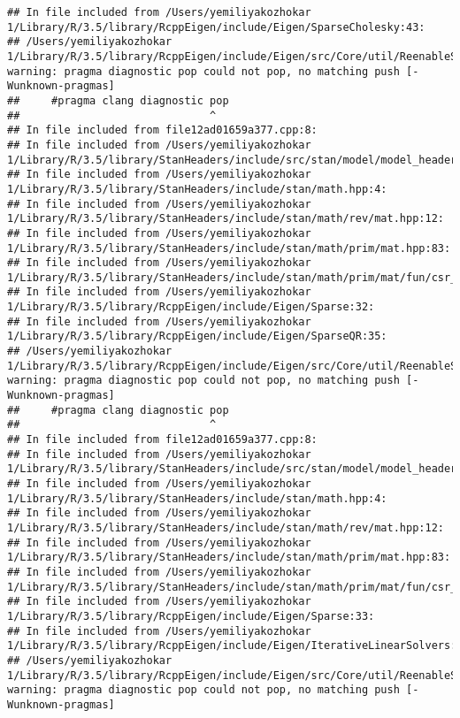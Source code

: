 \documentclass[]{article}
\begin{document}
\begin{verbatim}
## In file included from /Users/yemiliyakozhokar 1/Library/R/3.5/library/RcppEigen/include/Eigen/SparseCholesky:43:
## /Users/yemiliyakozhokar 1/Library/R/3.5/library/RcppEigen/include/Eigen/src/Core/util/ReenableStupidWarnings.h:10:30: warning: pragma diagnostic pop could not pop, no matching push [-Wunknown-pragmas]
##     #pragma clang diagnostic pop
##                              ^
## In file included from file12ad01659a377.cpp:8:
## In file included from /Users/yemiliyakozhokar 1/Library/R/3.5/library/StanHeaders/include/src/stan/model/model_header.hpp:4:
## In file included from /Users/yemiliyakozhokar 1/Library/R/3.5/library/StanHeaders/include/stan/math.hpp:4:
## In file included from /Users/yemiliyakozhokar 1/Library/R/3.5/library/StanHeaders/include/stan/math/rev/mat.hpp:12:
## In file included from /Users/yemiliyakozhokar 1/Library/R/3.5/library/StanHeaders/include/stan/math/prim/mat.hpp:83:
## In file included from /Users/yemiliyakozhokar 1/Library/R/3.5/library/StanHeaders/include/stan/math/prim/mat/fun/csr_extract_u.hpp:6:
## In file included from /Users/yemiliyakozhokar 1/Library/R/3.5/library/RcppEigen/include/Eigen/Sparse:32:
## In file included from /Users/yemiliyakozhokar 1/Library/R/3.5/library/RcppEigen/include/Eigen/SparseQR:35:
## /Users/yemiliyakozhokar 1/Library/R/3.5/library/RcppEigen/include/Eigen/src/Core/util/ReenableStupidWarnings.h:10:30: warning: pragma diagnostic pop could not pop, no matching push [-Wunknown-pragmas]
##     #pragma clang diagnostic pop
##                              ^
## In file included from file12ad01659a377.cpp:8:
## In file included from /Users/yemiliyakozhokar 1/Library/R/3.5/library/StanHeaders/include/src/stan/model/model_header.hpp:4:
## In file included from /Users/yemiliyakozhokar 1/Library/R/3.5/library/StanHeaders/include/stan/math.hpp:4:
## In file included from /Users/yemiliyakozhokar 1/Library/R/3.5/library/StanHeaders/include/stan/math/rev/mat.hpp:12:
## In file included from /Users/yemiliyakozhokar 1/Library/R/3.5/library/StanHeaders/include/stan/math/prim/mat.hpp:83:
## In file included from /Users/yemiliyakozhokar 1/Library/R/3.5/library/StanHeaders/include/stan/math/prim/mat/fun/csr_extract_u.hpp:6:
## In file included from /Users/yemiliyakozhokar 1/Library/R/3.5/library/RcppEigen/include/Eigen/Sparse:33:
## In file included from /Users/yemiliyakozhokar 1/Library/R/3.5/library/RcppEigen/include/Eigen/IterativeLinearSolvers:46:
## /Users/yemiliyakozhokar 1/Library/R/3.5/library/RcppEigen/include/Eigen/src/Core/util/ReenableStupidWarnings.h:10:30: warning: pragma diagnostic pop could not pop, no matching push [-Wunknown-pragmas]

\end{verbatim}
\end{document}

